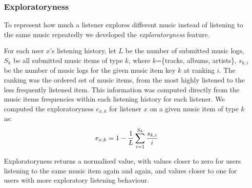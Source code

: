 \subsubsection{Exploratoryness}\label{subsec:exploratoryness}
	To represent how much a listener explores different music instead of listening to the same music repeatedly we developed the \emph{exploratoryness} feature. 

	For each user $x$'s listening history, let 
    $L$ be the number of submitted music logs,
    $S_k$ be all submitted music items of type $k$, where $k$=\{tracks, albums, artists\},
	$s_{k,i}$ be the number of music logs for the given music item key $k$ at ranking $i$. 
    The ranking was the ordered set of music items,  from the most highly listened to the less frequently listened item. This information was computed directly from the music items frequencies within each listening history for each listener.
    We computed the exploratoryness $e_{x,k}$ for listener $x$ on a given music item of type $k$ as:
    	\vspace{1em}
		\begin{equation}
			\abovedisplayskip=2pt plus 3pt minus 9pt
			\label{eq:exploratoryness}
			e_{x,k} = 1 - \frac{1}{L}\sum_{i=1}^{S_k}{\frac{s_{k,i}}{i}}
		\end{equation}
    




Exploratoryness  returns a normalised value, with values closer to zero for  users listening to the same music item again and again, and values closer to one for users with more exploratory listening behaviour. 





